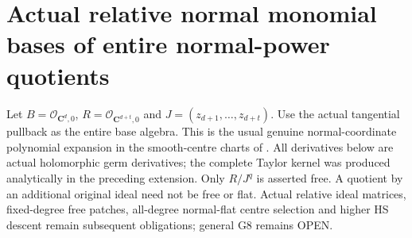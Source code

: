 \section{Actual relative normal monomial bases of entire normal-power quotients}
\label{sec:hironaka-relative-normal-monomial-basis}

Let $B=\mathcal O_{\mathbf C^d,0}$, $R=\mathcal O_{\mathbf C^{d+t},0}$
and $J=(z_{d+1},\ldots,z_{d+t})$. Use the actual tangential pullback as the
entire base algebra. This is the usual genuine normal-coordinate polynomial
expansion in the smooth-centre charts of \cite{bierstone-milman97-invent-math}.
All derivatives below are actual holomorphic germ derivatives; the complete
Taylor kernel was produced analytically in the preceding extension.
Only $R/J^q$ is asserted free. A quotient by an additional original ideal
need not be free or flat. Actual relative ideal matrices, fixed-degree free
patches, all-degree normal-flat centre selection and higher HS descent remain
subsequent obligations; general G8 remains OPEN.

